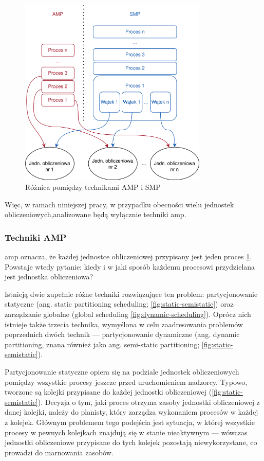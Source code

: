 \documentclass[../../main]{subfiles}
\begin{document}
\begin{figure}[ht]
    \centering
    \includegraphics[width=0.80\textwidth]{Images/amp-smp.png}
    \caption{Różnica pomiędzy technikami AMP i SMP}
    \label{fig:amp-smp}
\end{figure}

Więc, w ramach niniejszej pracy, w przypadku obecności wielu jednostek obliczeniowych,analizowane będą wyłącznie techniki \gls{amp}.

\subsubsection{Techniki AMP}

\gls{amp} oznacza, że każdej jednostce obliczeniowej przypisany jest jeden proces \cref{fig:amp-smp}. Powstaje wtedy pytanie: kiedy i w jaki sposób każdemu procesowi przydzielana jest jednostka obliczeniowa? 

Istnieją dwie zupełnie różne techniki rozwiązujące ten problem: partycjonowanie statyczne (ang. static partitioning scheduling; \cref{fig:static-semistatic}) oraz zarządzanie globalne (global scheduling \cref{fig:dynamic-scheduling}). Oprócz nich istnieje także trzecia technika, wymyślona w celu zaadresowania problemów poprzednich dwóch technik — partycjonowanie dynamiczne (ang. dynamic partitioning, znana również jako ang. semi-static partitioning; \cref{fig:static-semistatic}). \cite{saranya-hansdah}

Partycjonowanie statyczne opiera się na podziale jednostek obliczeniowych pomiędzy wszystkie procesy jeszcze przed uruchomieniem nadzorcy. Typowo, tworzone są kolejki przypisane do każdej jednostki obliczeniowej (\cref{fig:static-semistatic}). Decyzja o tym, jaki proces otrzyma zasoby jednostki obliczeniowej z danej kolejki, należy do planisty, który zarządza wykonaniem procesów w każdej z kolejek. Głównym problemem tego podejścia jest sytuacja, w której wszystkie procesy w pewnych kolejkach znajdują się w stanie nieaktywnym — wówczas jednostki obliczeniowe przypisane do tych kolejek pozostają niewykorzystane, co prowadzi do marnowania zasobów.
\end{document}
